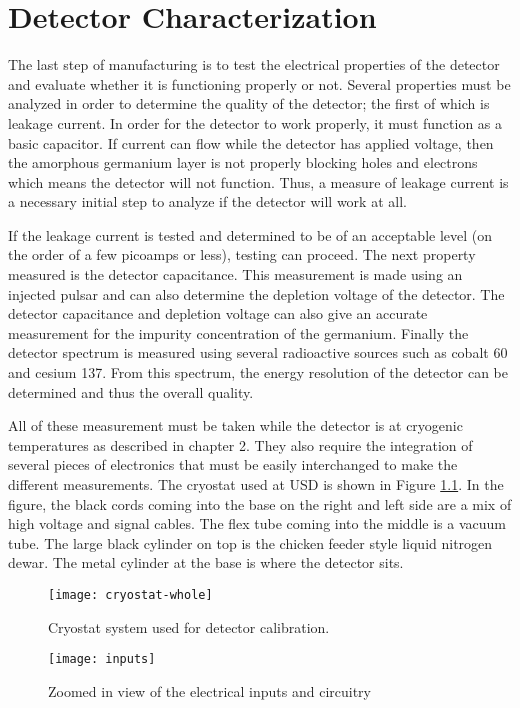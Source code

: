 \chapter{Detector Characterization}
The last step of manufacturing is to test the electrical properties of the detector and evaluate whether it is functioning properly or not.
Several properties must be analyzed in order to determine the quality of the detector; the first of which is leakage current.
In order for the detector to work properly, it must function as a basic capacitor.
If current can flow while the detector has applied voltage, then the amorphous germanium layer is not properly blocking holes and electrons which means the detector will not function.
Thus, a measure of leakage current is a necessary initial step to analyze if the detector will work at all.

If the leakage current is tested and determined to be of an acceptable level (on the order of a few picoamps or less), testing can proceed.
The next property measured is the detector capacitance.
This measurement is made using an injected pulsar and can also determine the depletion voltage of the detector.
The detector capacitance and depletion voltage can also give an accurate measurement for the impurity concentration of the germanium.
Finally the detector spectrum is measured using several radioactive sources such as cobalt 60 and cesium 137.
From this spectrum, the energy resolution of the detector can be determined and thus the overall quality.

All of these measurement must be taken while the detector is at cryogenic temperatures as described in chapter 2.
They also require the integration of several pieces of electronics that must be easily interchanged to make the different measurements.
The cryostat used at USD is shown in Figure \ref{fig:cryostat-whole}.
In the figure, the black cords coming into the base on the right and left side are a mix of high voltage and signal cables.
The flex tube coming into the middle is a vacuum tube.
The large black cylinder on top is the chicken feeder style liquid nitrogen dewar.
The metal cylinder at the base is where the detector sits.
\begin{figure}[htpb]
\centering
\texttt{[image: cryostat-whole]}
\caption{Cryostat system used for detector calibration.}
\label{fig:cryostat-whole}
\end{figure}


\begin{figure}[htpb]
\centering
\texttt{[image: inputs]}
\caption{Zoomed in view of the electrical inputs and circuitry}
\label{fig:inputs}
\end{figure}

